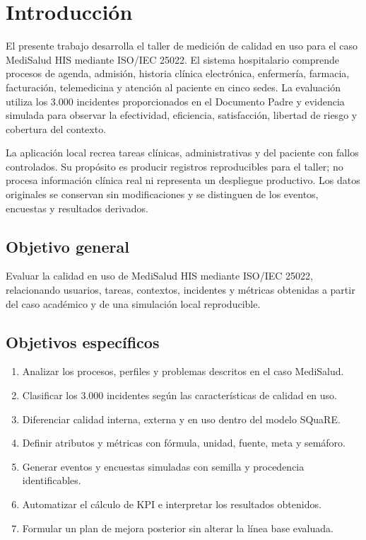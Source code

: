 \section{Introducción}

El presente trabajo desarrolla el taller de medición de calidad en uso para el caso MediSalud HIS mediante ISO/IEC 25022. El sistema hospitalario comprende procesos de agenda, admisión, historia clínica electrónica, enfermería, farmacia, facturación, telemedicina y atención al paciente en cinco sedes. La evaluación utiliza los 3.000 incidentes proporcionados en el Documento Padre y evidencia simulada para observar la efectividad, eficiencia, satisfacción, libertad de riesgo y cobertura del contexto.

La aplicación local recrea tareas clínicas, administrativas y del paciente con fallos controlados. Su propósito es producir registros reproducibles para el taller; no procesa información clínica real ni representa un despliegue productivo. Los datos originales se conservan sin modificaciones y se distinguen de los eventos, encuestas y resultados derivados.

\subsection{Objetivo general}

Evaluar la calidad en uso de MediSalud HIS mediante ISO/IEC 25022, relacionando usuarios, tareas, contextos, incidentes y métricas obtenidas a partir del caso académico y de una simulación local reproducible.

\subsection{Objetivos específicos}

\begin{enumerate}
  \item Analizar los procesos, perfiles y problemas descritos en el caso MediSalud.
  \item Clasificar los 3.000 incidentes según las características de calidad en uso.
  \item Diferenciar calidad interna, externa y en uso dentro del modelo SQuaRE.
  \item Definir atributos y métricas con fórmula, unidad, fuente, meta y semáforo.
  \item Generar eventos y encuestas simuladas con semilla y procedencia identificables.
  \item Automatizar el cálculo de KPI e interpretar los resultados obtenidos.
  \item Formular un plan de mejora posterior sin alterar la línea base evaluada.
\end{enumerate}
